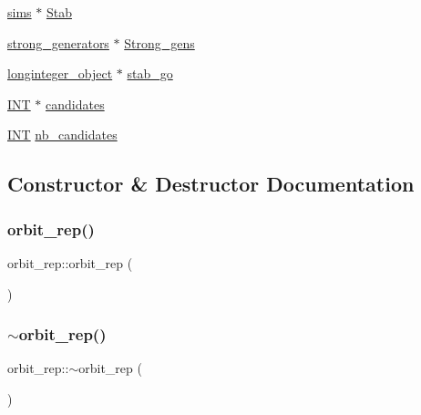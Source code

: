 \begin{DoxyCompactItemize}
\item 
\mbox{\hyperlink{classsims}{sims}} $\ast$ \mbox{\hyperlink{classorbit__rep_a69c61c216255b659630df7c89bf52fb9}{Stab}}
\item 
\mbox{\hyperlink{classstrong__generators}{strong\+\_\+generators}} $\ast$ \mbox{\hyperlink{classorbit__rep_ac1ad77be51eee2a372556327a32898c9}{Strong\+\_\+gens}}
\item 
\mbox{\hyperlink{classlonginteger__object}{longinteger\+\_\+object}} $\ast$ \mbox{\hyperlink{classorbit__rep_a2a7281428940925471b4a546ede7fe3d}{stab\+\_\+go}}
\item 
\mbox{\hyperlink{galois_8h_a09fddde158a3a20bd2dcadb609de11dc}{I\+NT}} $\ast$ \mbox{\hyperlink{classorbit__rep_ad0df86e7ddfadb6f059011f8251a14ae}{candidates}}
\item 
\mbox{\hyperlink{galois_8h_a09fddde158a3a20bd2dcadb609de11dc}{I\+NT}} \mbox{\hyperlink{classorbit__rep_a939fbf3e70ac58f85bd5dfd8365f3978}{nb\+\_\+candidates}}
\end{DoxyCompactItemize}


\subsection{Constructor \& Destructor Documentation}
\mbox{\label{classorbit__rep_a78ae6c8440d6ae240f9562cbd7a8b86c}} 
\subsubsection{\texorpdfstring{orbit\+\_\+rep()}{orbit\_rep()}}
{\footnotesize\ttfamily orbit\+\_\+rep\+::orbit\+\_\+rep (\begin{DoxyParamCaption}{ }\end{DoxyParamCaption})}

\mbox{\label{classorbit__rep_a72d5955dc2387f970d3f95511cb87597}} 
\subsubsection{\texorpdfstring{$\sim$orbit\+\_\+rep()}{~orbit\_rep()}}
{\footnotesize\ttfamily orbit\+\_\+rep\+::$\sim$orbit\+\_\+rep (\begin{DoxyParamCaption}{ }\end{DoxyParamCaption})}



